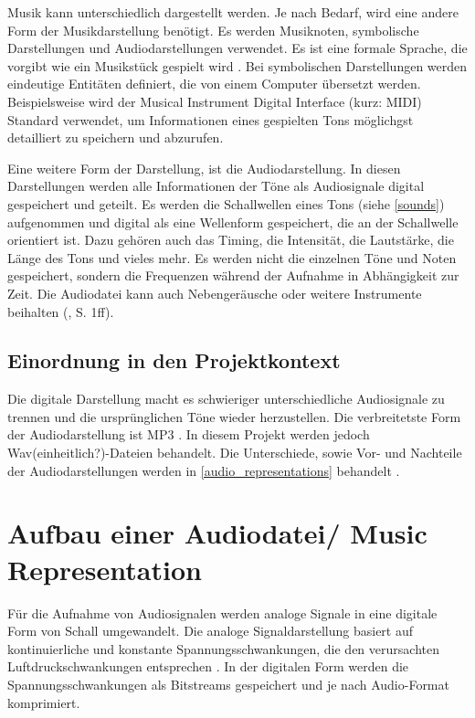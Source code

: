 Musik kann unterschiedlich dargestellt werden. Je nach Bedarf, wird eine andere Form der Musikdarstellung benötigt. Es werden Musiknoten, symbolische Darstellungen und Audiodarstellungen verwendet. Es ist eine formale Sprache, die vorgibt wie ein Musikstück gespielt wird \parencite{sheet_music_representations}. Bei symbolischen Darstellungen werden eindeutige Entitäten definiert, die von einem Computer übersetzt werden. Beispielsweise wird der Musical Instrument Digital Interface (kurz: MIDI) Standard verwendet, um Informationen eines gespielten Tons möglichgst detailliert zu speichern und abzurufen.

\par

Eine weitere Form der Darstellung, ist die Audiodarstellung. In diesen Darstellungen werden alle Informationen der Töne als Audiosignale digital gespeichert und geteilt. Es werden die Schallwellen eines Tons (siehe \cref{sounds}) aufgenommen und digital als eine Wellenform gespeichert, die an der Schallwelle orientiert ist. Dazu gehören auch das Timing, die Intensität, die Lautstärke, die Länge des Tons und vieles mehr. Es werden nicht die einzelnen Töne und Noten gespeichert, sondern die Frequenzen während der Aufnahme in Abhängigkeit zur Zeit. Die Audiodatei kann auch Nebengeräusche oder weitere Instrumente beihalten (\cite{fundamentals_of_music_processing}, S. 1ff).

\subsection{Einordnung in den Projektkontext}

Die digitale Darstellung macht es schwieriger unterschiedliche Audiosignale zu trennen und die ursprünglichen Töne wieder herzustellen. Die verbreitetste Form der Audiodarstellung ist MP3 \parencite{mp3_most_popular}. In diesem Projekt werden jedoch Wav(einheitlich?)-Dateien behandelt. Die Unterschiede, sowie Vor- und Nachteile der Audiodarstellungen werden in \cref{audio_representations} behandelt \parencite{fundamentals_of_music_processing}.

%
\section{Aufbau einer Audiodatei/ Music Representation}
%

Für die Aufnahme von Audiosignalen werden analoge Signale in eine digitale Form von Schall umgewandelt. Die analoge Signaldarstellung basiert auf kontinuierliche und konstante Spannungsschwankungen, die den verursachten Luftdruckschwankungen entsprechen \parencite{digital_representation}. In der digitalen Form werden die Spannungsschwankungen als Bitstreams gespeichert und je nach Audio-Format komprimiert.

